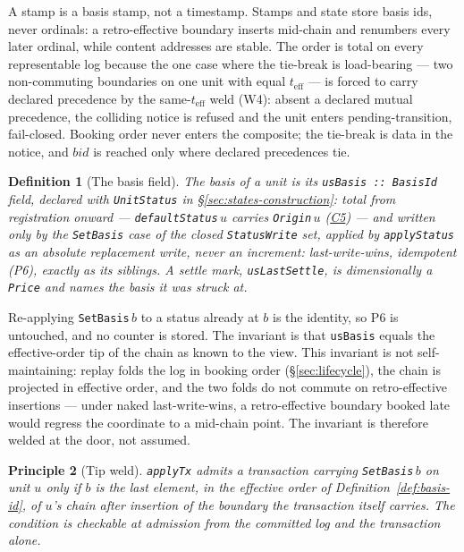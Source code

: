 \documentclass[11pt,a4paper]{article}
\newtheorem{definition}{Definition}[section]
\newtheorem{principle}[definition]{Principle}
\begin{document}
A stamp is a basis stamp, not a timestamp. Stamps and state store basis ids, never
ordinals: a retro-effective boundary
inserts mid-chain and renumbers every later ordinal, while content addresses are stable.
The order is total on every representable log because the one case where the tie-break
is load-bearing --- two non-commuting boundaries on one unit with equal
$t_{\mathrm{eff}}$ --- is forced to carry declared precedence by the same-$t_{\mathrm{eff}}$
weld (W4): absent a declared mutual precedence, the colliding notice is refused and the
unit enters pending-transition, fail-closed. Booking order never enters the composite; the tie-break
is data in the notice, and $\mathit{bid}$ is reached only where declared precedences tie.

\begin{definition}[The basis field]
\label{def:usbasis}
The basis of a unit is its \texttt{usBasis :: BasisId} field, declared with
\texttt{UnitStatus} in \S\ref{sec:states-construction}: total from registration onward
--- \texttt{defaultStatus}\,$u$ carries \texttt{Origin}\,$u$ (\hyperref[cond:C5]{C5}) ---
and written only by the \texttt{SetBasis} case of the closed \texttt{StatusWrite} set,
applied by \texttt{applyStatus} as an absolute replacement write, never an increment:
last-write-wins, idempotent (P6), exactly as its siblings. A settle mark,
\texttt{usLastSettle}, is dimensionally a \texttt{Price} and names the basis it was
struck at.
\end{definition}

Re-applying \texttt{SetBasis}\,$b$ to a status already at $b$ is the identity, so P6
is untouched, and no counter is stored. The invariant is that \texttt{usBasis} equals
the effective-order tip of the chain as known to the view. This invariant is not
self-maintaining: replay folds the log in booking order (\S\ref{sec:lifecycle}), the
chain is projected in effective order, and the two folds do not commute on
retro-effective insertions --- under naked last-write-wins, a retro-effective boundary
booked late would regress the coordinate to a mid-chain point. The invariant is
therefore welded at the door, not assumed.

\begin{principle}[Tip weld]
\label{prin:tip-weld}
\texttt{applyTx} admits a transaction carrying \texttt{SetBasis}\,$b$ on unit $u$ only if
$b$ is the last element, in the effective order of
Definition~\ref{def:basis-id}, of $u$'s chain after insertion of the boundary the
transaction itself carries. The condition is checkable at admission from the committed
log and the transaction alone.
\end{principle}
\end{document}
